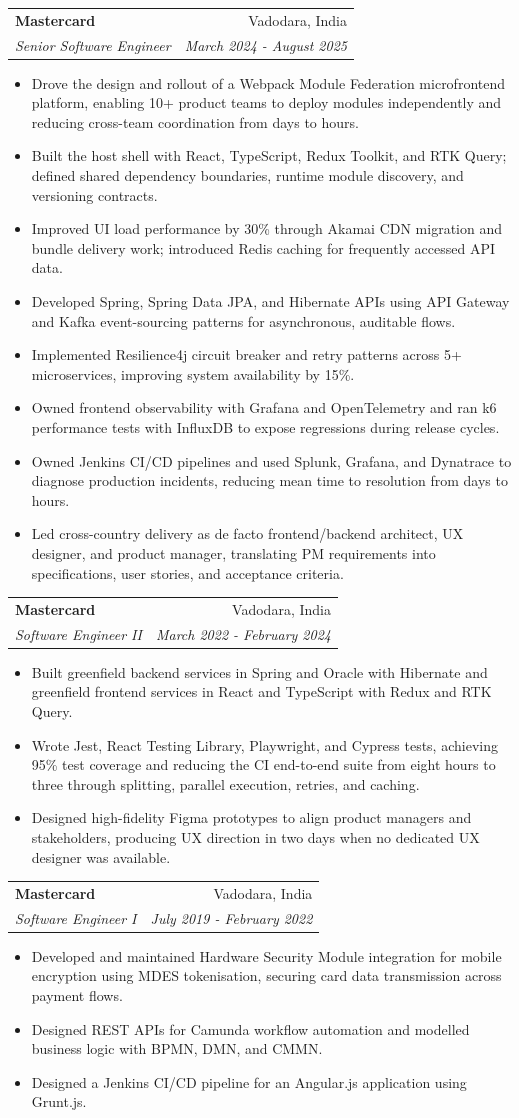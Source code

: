 \documentclass[a4paper,10pt]{article}
\makeatletter
\newcommand{\resumeItem}[1]{\item {\small #1}}
\newcommand{\resumeSubheading}[4]{
  \item
  \begin{tabular*}{1.0\textwidth}[t]{l@{\extracolsep{\fill}}r}
    \textbf{#1} & {\small #2} \\
    \textit{\small #3} & \textit{\small #4} \\
  \end{tabular*}\vspace{-4pt}
}
\newcommand{\resumeItemListStart}{\begin{itemize}}
\newcommand{\resumeItemListEnd}{\end{itemize}\vspace{-2pt}}
\makeatother
\begin{document}
    \resumeSubheading
      {Mastercard}{Vadodara, India}
      {Senior Software Engineer}{March 2024 - August 2025}
      \resumeItemListStart
        \resumeItem{Drove the design and rollout of a Webpack Module Federation microfrontend platform, enabling 10+ product teams to deploy modules independently and reducing cross-team coordination from days to hours.}
        \resumeItem{Built the host shell with React, TypeScript, Redux Toolkit, and RTK Query; defined shared dependency boundaries, runtime module discovery, and versioning contracts.}
        \resumeItem{Improved UI load performance by 30\% through Akamai CDN migration and bundle delivery work; introduced Redis caching for frequently accessed API data.}
        \resumeItem{Developed Spring, Spring Data JPA, and Hibernate APIs using API Gateway and Kafka event-sourcing patterns for asynchronous, auditable flows.}
        \resumeItem{Implemented Resilience4j circuit breaker and retry patterns across 5+ microservices, improving system availability by 15\%.}
        \resumeItem{Owned frontend observability with Grafana and OpenTelemetry and ran k6 performance tests with InfluxDB to expose regressions during release cycles.}
        \resumeItem{Owned Jenkins CI/CD pipelines and used Splunk, Grafana, and Dynatrace to diagnose production incidents, reducing mean time to resolution from days to hours.}
        \resumeItem{Led cross-country delivery as de facto frontend/backend architect, UX designer, and product manager, translating PM requirements into specifications, user stories, and acceptance criteria.}
      \resumeItemListEnd

    \resumeSubheading
      {Mastercard}{Vadodara, India}
      {Software Engineer II}{March 2022 - February 2024}
      \resumeItemListStart
        \resumeItem{Built greenfield backend services in Spring and Oracle with Hibernate and greenfield frontend services in React and TypeScript with Redux and RTK Query.}
        \resumeItem{Wrote Jest, React Testing Library, Playwright, and Cypress tests, achieving 95\% test coverage and reducing the CI end-to-end suite from eight hours to three through splitting, parallel execution, retries, and caching.}
        \resumeItem{Designed high-fidelity Figma prototypes to align product managers and stakeholders, producing UX direction in two days when no dedicated UX designer was available.}
      \resumeItemListEnd

    \resumeSubheading
      {Mastercard}{Vadodara, India}
      {Software Engineer I}{July 2019 - February 2022}
      \resumeItemListStart
        \resumeItem{Developed and maintained Hardware Security Module integration for mobile encryption using MDES tokenisation, securing card data transmission across payment flows.}
        \resumeItem{Designed REST APIs for Camunda workflow automation and modelled business logic with BPMN, DMN, and CMMN.}
        \resumeItem{Designed a Jenkins CI/CD pipeline for an Angular.js application using Grunt.js.}
      \resumeItemListEnd
\end{document}
